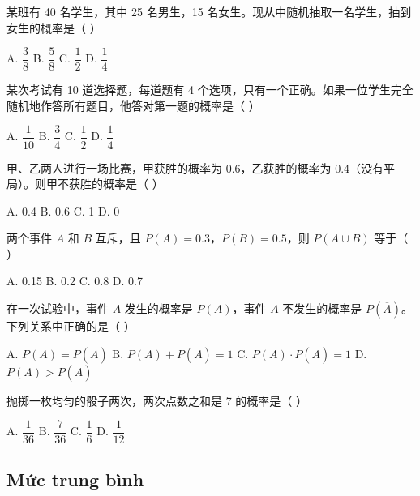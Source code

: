 \documentclass[11pt, a4paper]{article}
\begin{document}
\begin{baitap}[1]
某班有 40 名学生，其中 25 名男生，15 名女生。现从中随机抽取一名学生，抽到女生的概率是（ ）
\par\vspace{3pt}
\noindent A. $\dfrac{3}{8}$ \quad B. $\dfrac{5}{8}$ \quad C. $\dfrac{1}{2}$ \quad D. $\dfrac{1}{4}$
\end{baitap}
\begin{baitap}[2]
某次考试有 10 道选择题，每道题有 4 个选项，只有一个正确。如果一位学生完全随机地作答所有题目，他答对第一题的概率是（ ）
\par\vspace{3pt}
\noindent A. $\dfrac{1}{10}$ \quad B. $\dfrac{3}{4}$ \quad C. $\dfrac{1}{2}$ \quad D. $\dfrac{1}{4}$
\end{baitap}
\begin{baitap}[3]
甲、乙两人进行一场比赛，甲获胜的概率为 0.6，乙获胜的概率为 0.4（没有平局）。则甲不获胜的概率是（ ）
\par\vspace{3pt}
\noindent A. 0.4 \quad B. 0.6 \quad C. 1 \quad D. 0
\end{baitap}
\begin{baitap}[4]
两个事件 $A$ 和 $B$ 互斥，且 $P(A)=0.3$，$P(B)=0.5$，则 $P(A\cup B)$ 等于（ ）
\par\vspace{3pt}
\noindent A. 0.15 \quad B. 0.2 \quad C. 0.8 \quad D. 0.7
\end{baitap}
\begin{baitap}[5]
在一次试验中，事件 $A$ 发生的概率是 $P(A)$，事件 $A$ 不发生的概率是 $P(\overline{A})$。下列关系中正确的是（ ）
\par\vspace{3pt}
\noindent A. $P(A)=P(\overline{A})$ \quad B. $P(A)+P(\overline{A})=1$ \quad C. $P(A)\cdot P(\overline{A})=1$ \quad D. $P(A)>P(\overline{A})$
\end{baitap}
\begin{baitap}[6]
抛掷一枚均匀的骰子两次，两次点数之和是 7 的概率是（ ）
\par\vspace{3pt}
\noindent A. $\dfrac{1}{36}$ \quad B. $\dfrac{7}{36}$ \quad C. $\dfrac{1}{6}$ \quad D. $\dfrac{1}{12}$
\end{baitap}
\subsection{Mức trung bình}
\end{document}
